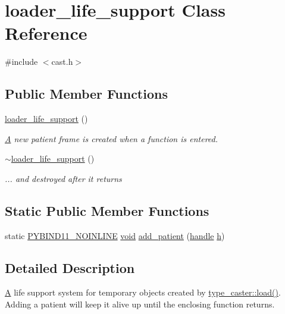 \hypertarget{classloader__life__support}{}\section{loader\+\_\+life\+\_\+support Class Reference}
\label{classloader__life__support}


{\ttfamily \#include $<$cast.\+h$>$}

\subsection*{Public Member Functions}
\begin{DoxyCompactItemize}
\item 
\mbox{\hyperlink{classloader__life__support_abd8830be409a78f3dfb6741b045ad929}{loader\+\_\+life\+\_\+support}} ()
\begin{DoxyCompactList}\small\item\em \mbox{\hyperlink{struct_a}{A}} new patient frame is created when a function is entered. \end{DoxyCompactList}\item 
\mbox{\hyperlink{classloader__life__support_ae37f1ea05059dff6ef805d1dcd34b3e4}{$\sim$loader\+\_\+life\+\_\+support}} ()
\begin{DoxyCompactList}\small\item\em ... and destroyed after it returns \end{DoxyCompactList}\end{DoxyCompactItemize}
\subsection*{Static Public Member Functions}
\begin{DoxyCompactItemize}
\item 
static \mbox{\hyperlink{detail_2common_8h_a1fb186b7494d5c576d902c0730ecbb71}{P\+Y\+B\+I\+N\+D11\+\_\+\+N\+O\+I\+N\+L\+I\+NE}} \mbox{\hyperlink{_s_d_l__opengles2__gl2ext_8h_ae5d8fa23ad07c48bb609509eae494c95}{void}} \mbox{\hyperlink{classloader__life__support_a0759a5fe160fb836f1f1d47eecdfb36f}{add\+\_\+patient}} (\mbox{\hyperlink{classhandle}{handle}} \mbox{\hyperlink{_s_d_l__opengl__glext_8h_afa0fb1b5e976920c0abeff2dca3ed774}{h}})
\end{DoxyCompactItemize}


\subsection{Detailed Description}
\mbox{\hyperlink{struct_a}{A}} life support system for temporary objects created by {\ttfamily \mbox{\hyperlink{classtype__caster__generic_aa841c81d370ff23ccafa8507cc01a0b1}{type\+\_\+caster\+::load()}}}. Adding a patient will keep it alive up until the enclosing function returns. 

